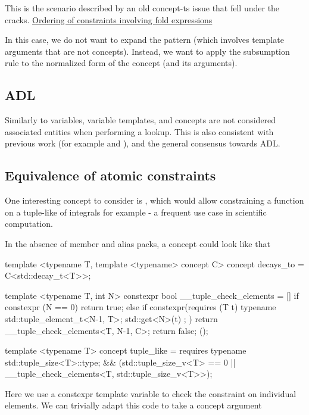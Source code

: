 \documentclass{wg21}
\begin{document}
This is the scenario described by an old concept-ts issue that fell under the cracks.
\href{http://cplusplus.github.io/concepts-ts/ts-active.html#28}{Ordering of constraints involving fold expressions}

In this case, we do not want to expand the pattern (which involves template arguments that are not concepts).
Instead, we want to apply the subsumption rule to the normalized form of the concept (and its arguments).

\subsection{ADL}

Similarly to variables, variable templates, and concepts are not considered associated entities
when performing a lookup. This is also consistent with previous work (for example  and ),
and the general consensus towards ADL.

\subsection{Equivalence of atomic constraints}

One interesting concept to consider is , which would allow constraining a function on a tuple-like of integrals for example - a frequent use case in scientific
computation.

In the absence of member and alias packs, a  concept could look like that

\begin{colorblock}
template <typename T, template <typename> concept C>
concept decays_to = C<std::decay_t<T>>;

template <typename T, int N>
constexpr bool __tuple_check_elements = [] {
    if constexpr (N == 0)
    return true;
    else if constexpr(requires (T t) {
        typename std::tuple_element_t<N-1, T>;
        { std::get<N>(t) };
    })
    return  __tuple_check_elements<T, N-1, C>;
    return false;
}();

template <typename T>
concept tuple_like = requires {
    typename std::tuple_size<T>::type;
} &&  (std::tuple_size_v<T>  == 0 || __tuple_check_elements<T, std::tuple_size_v<T>>);
\end{colorblock}

Here we use a constexpr template variable to check the constraint on individual elements.
We can trivially adapt this code to take a concept argument
\end{document}
